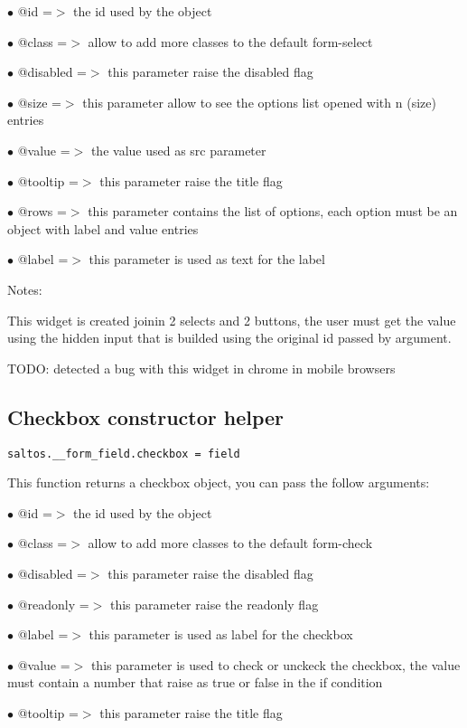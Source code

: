 \documentclass[a4paper]{book}
\begin{document}
\begin{compactitem}
\item[\color{myblue}$\bullet$] @id       =$>$ the id used by the object
\item[\color{myblue}$\bullet$] @class    =$>$ allow to add more classes to the default form-select
\item[\color{myblue}$\bullet$] @disabled =$>$ this parameter raise the disabled flag
\item[\color{myblue}$\bullet$] @size     =$>$ this parameter allow to see the options list opened with n (size) entries
\item[\color{myblue}$\bullet$] @value    =$>$ the value used as src parameter
\item[\color{myblue}$\bullet$] @tooltip  =$>$ this parameter raise the title flag
\item[\color{myblue}$\bullet$] @rows     =$>$ this parameter contains the list of options, each option must be an object
             with label and value entries
\item[\color{myblue}$\bullet$] @label    =$>$ this parameter is used as text for the label
\end{compactitem}

Notes:

This widget is created joinin 2 selects and 2 buttons, the user must get the value
using the hidden input that is builded using the original id passed by argument.

TODO: detected a bug with this widget in chrome in mobile browsers

\hypertarget{toc388}{}
\subsection{Checkbox constructor helper}

\begin{lstlisting}
saltos.__form_field.checkbox = field
\end{lstlisting}

This function returns a checkbox object, you can pass the follow arguments:

\begin{compactitem}
\item[\color{myblue}$\bullet$] @id       =$>$ the id used by the object
\item[\color{myblue}$\bullet$] @class    =$>$ allow to add more classes to the default form-check
\item[\color{myblue}$\bullet$] @disabled =$>$ this parameter raise the disabled flag
\item[\color{myblue}$\bullet$] @readonly =$>$ this parameter raise the readonly flag
\item[\color{myblue}$\bullet$] @label    =$>$ this parameter is used as label for the checkbox
\item[\color{myblue}$\bullet$] @value    =$>$ this parameter is used to check or unckeck the checkbox, the value
             must contain a number that raise as true or false in the if condition
\item[\color{myblue}$\bullet$] @tooltip  =$>$ this parameter raise the title flag
\end{compactitem}
\end{document}
